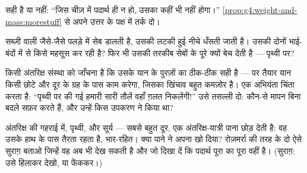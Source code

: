 \begin{exercise}[$\star$]\label{exo:g4:weight-and-mass:8}
सही है या नहीं: ``जिस चीज़ में पदार्थ ही न हो, उसका  कहीं भी नहीं
होगा।'' \cref{prop:g4:weight-and-mass:morestuff} से अपने उत्तर के
पक्ष में तर्क दो।
\end{exercise}

\begin{exercise}[$\star$]\label{exo:g4:weight-and-mass:9}
सब्ज़ी वाली जैसे-जैसे पलड़े में सेब डालती है, उसकी लटकी हुई 
नीचे धँसती जाती है। उसकी  दोनों भाई-बंदों में से किसे महसूस कर
रही है? फिर भी उसकी तरकीब सेबों के पूरे  क्यों बेच देती है
--- पृथ्वी पर?
\end{exercise}

\begin{exercise}[$\star\star$]\label{exo:g4:weight-and-mass:10}
किसी अंतरिक्ष संस्था को जाँचना है कि उसके यान के पुरज़ों का 
ठीक-ठीक सही है --- पर तैयार यान किसी छोटे और दूर के ग्रह के पास काम
करेगा, जिसका खिंचाव बहुत कमज़ोर है। एक अभियंता चिंता करता है:
``पृथ्वी पर की गई हमारी सारी तौलें वहाँ ग़लत निकलेंगी!'' उसे तसल्ली
दो: कौन-से मापन बिना बदले सफ़र करते हैं, और उन्हें किस उपकरण ने किया
था?
\end{exercise}

\begin{exercise}[$\star\star$]\label{exo:g4:weight-and-mass:11}
अंतरिक्ष की गहराई में, पृथ्वी,  और सूर्य --- सबसे बहुत दूर,
एक अंतरिक्ष-यात्री पाना छोड़ देती है: वह उसके हाथ के पास तैरता रहता
है, भार-रहित। क्या पाने ने अपना  खो दिया? रोज़मर्रा की तरह के
दो ऐसे सुराग़ बताओ जिन्हें वह अब भी देख सकती है और जो दिखा दें कि
पदार्थ पूरा का पूरा वहीं है। (सुराग़: उसे हिलाकर देखो, या फेंककर।)
\end{exercise}
